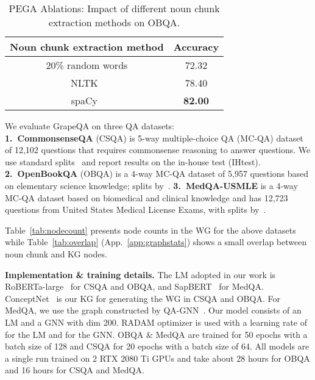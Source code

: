 \documentclass[11pt]{article}
\renewcommand{\paragraph}[1]{\vspace{1mm}\noindent\textbf{#1}}
\newcommand{\roberta}{RoBERTa-large}
\newcommand{\methodname}{GrapeQA}
\begin{document}
\begin{table}[t]
\caption{PEGA Ablations: Impact of different noun chunk extraction methods on OBQA.}
\centering
\vspace{1mm}
\begin{tabular}{cc}
\toprule
\textbf{Noun chunk extraction method} & \textbf{Accuracy} \\
\midrule
20\% random words & 72.32\\ 
NLTK~\small{\cite{journals/corr/cs-CL-0205028}} & 78.40 \\ 
spaCy~\small{\cite{Honnibal_spaCy_Industrial-strength_Natural_2020}} & \bf 82.00 \\ 
\bottomrule
\end{tabular}



\label{tab:noun_chunk_ablations}
\end{table}

We evaluate \methodname{} on three QA datasets: \\
\textbf{1.~CommonsenseQA} (CSQA) is 5-way multiple-choice QA (MC-QA) dataset of 12,102 questions that requires commonsense reasoning to answer questions.
We use standard splits~\cite{lin-etal-2019-kagnet} and report results on the in-house test (IHtest).
\textbf{2.~OpenBookQA} (OBQA) is a 4-way MC-QA dataset of 5,957 questions based on elementary science knowledge; splits by~\citet{mihaylov2018can}.
\textbf{3.~MedQA-USMLE} is a 4-way MC-QA dataset based on biomedical and clinical knowledge and has 12,723 questions from United States Medical License Exams, with splits by~\citet{jin2021disease}.

Table~\ref{tab:nodecount} presents node counts in the WG for the above datasets while Table~\ref{tab:overlap} (App.~\ref{app:graphstats}) shows a small overlap between noun chunk and KG nodes.



\paragraph{Implementation \& training details.}
The LM adopted in our work is \roberta~\cite{DBLP:journals/corr/abs-1907-11692} for CSQA and OBQA, and SapBERT~\cite{https://doi.org/10.48550/arxiv.2010.11784} for MedQA.
ConceptNet~\cite{speer2017conceptnet} is our KG for generating the WG in CSQA and OBQA.
For MedQA, we use the graph constructed by QA-GNN~\cite{yasunaga-etal-2021-qa}.
Our model consists of an LM and a GNN with dim 200.
RADAM optimizer is used with a learning rate of  for the LM and  for the GNN.
OBQA \& MedQA are trained for 50 epochs with a batch size of 128 and CSQA for 20 epochs with a batch size of 64.
All models are a single run trained on 2 RTX 2080 Ti GPUs and take about 28 hours for OBQA and 16 hours for CSQA and MedQA.
\end{document}
